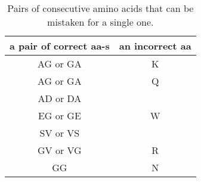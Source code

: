 \documentclass{article}[12pt]
\begin{document}
\begin{landscape}

\begin{table}[ht]\footnotesize
\vspace{3mm}
{\centering
\begin{center}
\begin{tabular}{|c|c|}
  \hline
  a pair of correct aa-s & an incorrect aa \\
  \hline
  AG or GA & K \\
  \hline
  AG or GA & Q \\
  \hline
  AD or DA & \multirow{3}{*}{W} \\
  EG or GE & \\
  SV or VS & \\
  \hline
  GV or VG & R \\
  \hline
  GG & N \\
  \hline
\end{tabular}
\end{center}
\par}
\centering
\caption{Pairs of consecutive amino acids that can be mistaken for a single one.}
\vspace{3mm}
\label{table:errors-vs}
\end{table}

\end{landscape}


\end{document}
